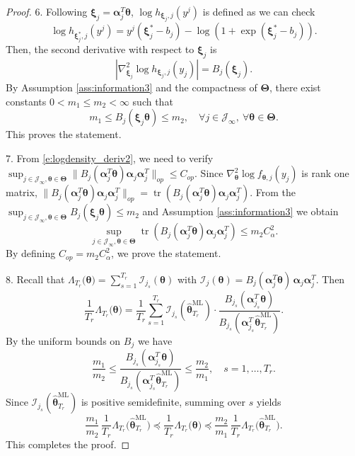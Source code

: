 \documentclass[12pt]{article}
\newcommand{\bfTheta}{\boldsymbol{\Theta}}
\newcommand{\bfalpha}{\boldsymbol{\alpha}}
\newcommand{\bftheta}{\boldsymbol{\theta}}
\newcommand{\bfxi}{\boldsymbol{\xi}}
\begin{document}
\begin{proof}
6. Following $\bfxi_j = \bfalpha_j^T \bftheta$, $\log h_{\bfxi_j, j}(y^j)$ is defined as we can check 
\begin{equation} \label{e:density_reparam}
\log h_{\bfxi_j^{\ast}, j}(y^j) = y^j (\bfxi_j^{\ast} - b_j) - \log( 1 + \exp( \bfxi_j^{\ast} - b_j)).
\end{equation}
Then, the second derivative with respect to $\bfxi_j$ is 
\begin{equation*}
| \nabla_{\bfxi_j}^2 \log h_{\bfxi_j, j}(y_j)| = B_{j}(\bfxi_j).
\end{equation*}
By Assumption \ref{ass:information3} and the compactness of $\bfTheta$, there exist
constants $0 < m_1 \le m_2 < \infty$ such that
\begin{equation*}
m_1 \le B_j(\bfxi_j \bftheta) \le m_2,
\quad
\forall j\in\mathcal J_\infty,\ \forall \bftheta\in\bfTheta.
\end{equation*}
This proves the statement.

7. From \eqref{e:logdensity_deriv2}, we need to verify $\sup_{j \in \mathcal{J}_{\infty}, \bftheta \in \bfTheta} \| B_j(\bfalpha_j^T \bftheta) \bfalpha_j \bfalpha_j^T \|_{op} \leq C_{op}$. Since $\nabla_{\bftheta}^2 \log f_{\bftheta, j}(y_j)$ is rank one matrix, $\| B_j(\bfalpha_j^T \bftheta) \bfalpha_j \bfalpha_j^T \|_{op} = \operatorname{tr}(B_j(\bfalpha_j^T \bftheta) \bfalpha_j \bfalpha_j^T)$. From the $\sup_{j \in \mathcal{J}_{\infty}, \bftheta \in \bfTheta} B_j( \bfxi_j \bftheta)\le m_2$ and Assumption \ref{ass:information3} we obtain
\begin{equation*}
\sup_{j \in \mathcal{J}_{\infty}, \bftheta \in \bfTheta} \operatorname{tr}(B_j(\bfalpha_j^T \bftheta) \bfalpha_j \bfalpha_j^T) \le m_2 C_{\alpha}^2.
\end{equation*}
By defining $C_{op} = m_2 C_{\alpha}^2$, we prove the statement.


8. Recall that
$\Lambda_{T_r}\bigl(\bftheta\bigr)
 = \sum_{s=1}^{T_r}\mathcal I_{j_s}(\bftheta)$
with
$\mathcal I_j(\bftheta) = B_j(\bfalpha_j^T \bftheta)\,
\bfalpha_j\bfalpha_j^T$.
Then
\begin{equation*}
\frac{1}{T_r}\Lambda_{T_r}\bigl(\bftheta \bigr)
= \frac{1}{T_r}\sum_{s=1}^{T_r}
\mathcal I_{j_s}(\hat{\bftheta}^{\mathrm{ML}}_{T_r})
\cdot
\frac{B_{j_s}(\bfalpha_{j_s}^T \bftheta)}{B_{j_s}(\bfalpha_{j_s}^T \hat{\bftheta}^{\mathrm{ML}}_{T_r})}.
\end{equation*}
By the uniform bounds on $B_j$ we have
\begin{equation*}
\frac{m_1}{m_2}
\le
\frac{B_{j_s}(\bfalpha_{j_s}^T \bftheta)}
{B_{j_s}(\bfalpha_{j_s}^T \hat{\bftheta}^{\mathrm{ML}}_{T_r})}
\le
\frac{m_2}{m_1},
\quad s=1,\dots,T_r.
\end{equation*}
Since $\mathcal I_{j_s}(\hat{\bftheta}^{\mathrm{ML}}_{T_r})$ is positive semidefinite,
summing over $s$ yields
\begin{equation*}
\frac{m_1}{m_2}\,\frac{1}{T_r}\Lambda_{T_r}\bigl(\hat{\bftheta}^{\mathrm{ML}}_{T_r}\bigr)
\preceq
\frac{1}{T_r}\Lambda_{T_r}\bigl(\bftheta\bigr)
\preceq
\frac{m_2}{m_1}\,\frac{1}{T_r}\Lambda_{T_r}\bigl( \hat{\bftheta}^{\mathrm{ML}}_{T_r} \bigr).
\end{equation*}
This completes the proof.
\end{proof}
\end{document}
